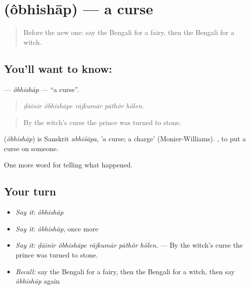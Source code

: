 \section[\texorpdfstring{\bn{অভিশাপ} (ôbhishāp)}{অভিশাপ (ôbhishāp)}]{ (ôbhishāp) — a curse}

\label{lesson:BN-C322-obhishap}



\begin{quote}
Before the new one: say the Bengali for a fairy, then the Bengali for a witch.
\end{quote}

\subsection*{You'll want to know: }
\textbf{} — \emph{ôbhishāp} — \textquotedblleft{}a curse\textquotedblright{}.

\begin{quote}
    
\end{quote}

\begin{quote}
\emph{ḍāinir ôbhishāpe rājkumār pāthôr hôlen.}
\end{quote}

\begin{quote}
By the witch's curse the prince was turned to stone.
\end{quote}

\begin{cousinweb}
\textbf{} (\emph{ôbhishāp}) is Sanskrit \emph{abhiśāpa}, 'a curse; a charge' (Monier-Williams).  , to put a curse on someone.
\end{cousinweb}

\begin{grammarlens}[title={What you've built}]
One more word for telling what happened.
\end{grammarlens}

\subsection*{Your turn}
\begin{itemize}
\raggedright
  \item \emph{Say it:} \emph{ôbhishāp}
  \item \emph{Say it:} \emph{ôbhishāp}, once more
  \item \emph{Say it:} \emph{ḍāinir ôbhishāpe rājkumār pāthôr hôlen.} — By the witch's curse the prince was turned to stone.
  \item \emph{Recall:} say the Bengali for a fairy, then the Bengali for a witch, then say \emph{ôbhishāp} again
\end{itemize}

